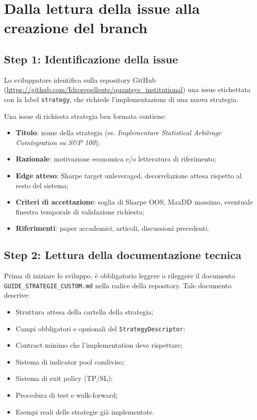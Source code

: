 \section{Dalla lettura della issue alla creazione del branch}

\subsection{Step 1: Identificazione della issue}

Lo sviluppatore identifica sulla repository GitHub (\url{https://github.com/Idrorepellente/quantsys_institutional}) una issue etichettata con la label \texttt{strategy}, che richiede l'implementazione di una nuova strategia.

Una issue di richiesta strategia ben formata contiene:

\begin{itemize}
  \item \textbf{Titolo}: nome della strategia (es. \emph{Implementare Statistical Arbitrage Cointegration su S\&P 100});
  \item \textbf{Razionale}: motivazione economica e/o letteratura di riferimento;
  \item \textbf{Edge atteso}: Sharpe target unleveraged, decorrelazione attesa rispetto al resto del sistema;
  \item \textbf{Criteri di accettazione}: soglia di Sharpe OOS, MaxDD massimo, eventuale finestra temporale di validazione richiesta;
  \item \textbf{Riferimenti}: paper accademici, articoli, discussioni precedenti.
\end{itemize}

\subsection{Step 2: Lettura della documentazione tecnica}

Prima di iniziare lo sviluppo, è obbligatorio leggere o rileggere il documento \texttt{GUIDE\_STRATEGIE\_CUSTOM.md} nella radice della repository. Tale documento descrive:

\begin{itemize}
  \item Struttura attesa della cartella della strategia;
  \item Campi obbligatori e opzionali del \texttt{StrategyDescriptor};
  \item Contract minimo che l'implementation deve rispettare;
  \item Sistema di indicator pool condiviso;
  \item Sistema di exit policy (TP/SL);
  \item Procedura di test e walk-forward;
  \item Esempi reali delle strategie già implementate.
\end{itemize}

